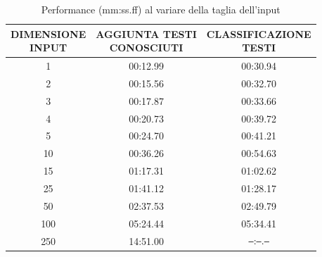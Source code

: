 \documentclass[titlepage]{article}
\begin{document}
\begin{table}[htp]
\centering
\begin{tabular}{ccc}
    \toprule
    \makecell{\textbf{DIMENSIONE} \\ \textbf{INPUT}} & \makecell{\textbf{AGGIUNTA TESTI} \\ \textbf{CONOSCIUTI}} & \makecell{\textbf{CLASSIFICAZIONE} \\ \textbf{TESTI}} \\
    
    \midrule
    1 & 00:12.99 & 00:30.94 \\
    
    \midrule
    2 & 00:15.56 & 00:32.70 \\
    
    \midrule
    3 & 00:17.87 & 00:33.66 \\
    
    \midrule
    4 & 00:20.73 & 00:39.72 \\
    
    \midrule
    5 & 00:24.70 & 00:41.21 \\
    
    \midrule
    10 & 00:36.26 & 00:54.63 \\
    
    \midrule
    15 & 01:17.31 & 01:02.62 \\
    
    \midrule
    25 & 01:41.12 & 01:28.17 \\
    
    \midrule
    50 & 02:37.53 & 02:49.79 \\
    
    \midrule
    100 & 05:24.44 & 05:34.41 \\
    
    \midrule
    250 & 14:51.00 & \texttt{--}:\texttt{--}.\texttt{--} \\
    
    \bottomrule
\end{tabular}
\caption{Performance (mm:ss.ff) al variare della taglia dell'input}
\end{table}
\end{document}
